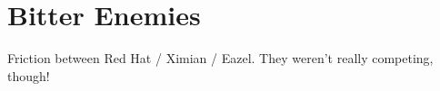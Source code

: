 \chapter{Bitter Enemies}

Friction between Red Hat / Ximian / Eazel.  They weren't really
competing, though!

